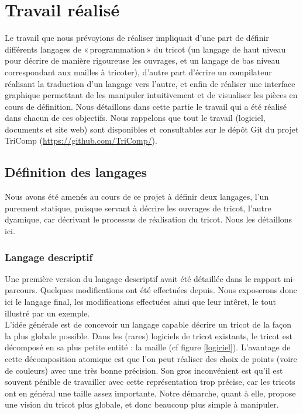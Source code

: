 \documentclass{article}
\begin{document}
\section{Travail réalisé}

Le travail que nous prévoyions de réaliser impliquait d'une part de
définir différents langages de «\,programmation\,» du tricot (un langage
de haut niveau pour décrire de manière rigoureuse les ouvrages, et un
langage de bas niveau correspondant aux mailles à tricoter), d'autre
part d'écrire un compilateur réalisant la traduction d'un langage vers
l'autre, et enfin de réaliser une interface graphique permettant de
les manipuler intuitivement et de visualiser les pièces en cours de
définition. Nous détaillons dans cette partie le travail qui a été
réalisé dans chacun de ces objectifs. Nous rappelons que tout le
travail (logiciel, documents et site web) sont disponibles et
consultables sur le dépôt Git du projet
TriComp (\url{https://github.com/TriComp/}).

\subsection{Définition des langages}

Nous avons été amenés au cours de ce projet à définir deux langages,
l'un purement statique, puisque servant à décrire les ouvrages de
tricot, l'autre dyamique, car décrivant le processus de réalisation du
tricot. Nous les détaillons ici.

\subsubsection{Langage descriptif}

Une première version du langage descriptif avait été détaillée dans le
rapport mi-parcours. Quelques modifications ont été effectuées
depuis. Nous exposerons donc ici le langage final, les modifications
effectuées ainsi que leur intêret, le tout illustré par un exemple. \\


L'idée générale est de concevoir un langage capable décrire un tricot
de la façon la plus globale possible. Dans les (rares) logiciels de
tricot existants, le tricot est décomposé en sa plus petite entité
: la maille (cf figure \ref{logiciel}). L'avantage de cette
décomposition atomique est que l'on peut réaliser des choix de points
(voire de couleurs) avec une très bonne précision. 
Son gros inconvénient est qu'il est souvent
pénible de travailler avec cette représentation trop précise, car les tricots 
ont en général une taille assez importante. %
Notre démarche, quant à elle, propose une vision du tricot plus globale, 
et donc beaucoup plus simple à manipuler.
\end{document}
